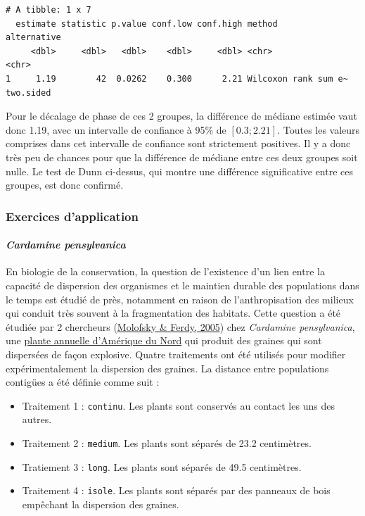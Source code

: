 \documentclass[
  a4paper,
]{article}
\providecommand{\tightlist}{%
  \setlength{\itemsep}{0pt}\setlength{\parskip}{0pt}}
\begin{document}
\begin{verbatim}
# A tibble: 1 x 7
  estimate statistic p.value conf.low conf.high method               alternative
     <dbl>     <dbl>   <dbl>    <dbl>     <dbl> <chr>                <chr>      
1     1.19        42  0.0262    0.300      2.21 Wilcoxon rank sum e~ two.sided  
\end{verbatim}

Pour le décalage de phase de ces 2 groupes, la différence de médiane estimée vaut donc 1.19, avec un intervalle de confiance à 95\% de \([0.3 ; 2.21]\). Toutes les valeurs comprises dans cet intervalle de confiance sont strictement positives. Il y a donc très peu de chances pour que la différence de médiane entre ces deux groupes soit nulle. Le test de Dunn ci-dessus, qui montre une différence significative entre ces groupes, est donc confirmé.

\hypertarget{exercices-dapplication}{%
\subsubsection{Exercices d'application}\label{exercices-dapplication}}

\hypertarget{cardamine-pensylvanica}{%
\paragraph{\texorpdfstring{\emph{Cardamine pensylvanica}}{Cardamine pensylvanica}}\label{cardamine-pensylvanica}}

En biologie de la conservation, la question de l'existence d'un lien entre la capacité de dispersion des organismes et le maintien durable des populations dans le temps est étudié de près, notamment en raison de l'anthropisation des milieux qui conduit très souvent à la fragmentation des habitats. Cette question a été étudiée par 2 chercheurs (\protect\hyperlink{ref-Molofsky2005}{Molofsky \& Ferdy, 2005}) chez \emph{Cardamine pensylvanica}, une \href{https://en.wikipedia.org/wiki/Cardamine_pensylvanica}{plante annuelle d'Amérique du Nord} qui produit des graines qui sont dispersées de façon explosive. Quatre traitements ont été utilisés pour modifier expérimentalement la dispersion des graines. La distance entre populations contigües a été définie comme suit :

\begin{itemize}
\tightlist
\item
  Traitement 1 : \texttt{continu}. Les plants sont conservés au contact les uns des autres.
\item
  Traitement 2 : \texttt{medium}. Les plants sont séparés de 23.2 centimètres.
\item
  Tratiement 3 : \texttt{long}. Les plants sont séparés de 49.5 centimètres.
\item
  Traitement 4 : \texttt{isole}. Les plants sont séparés par des panneaux de bois empêchant la dispersion des graines.
\end{itemize}
\end{document}
